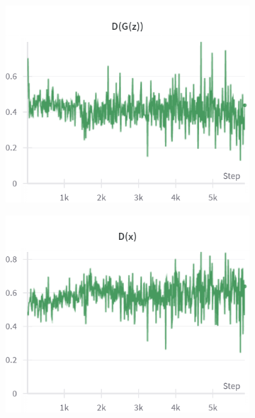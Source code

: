 \begin{figure}[H]
    \begin{subfigure}{0.45\textwidth}
        \centering
        \includegraphics[width=0.95\linewidth]{cifar10/32/D_G_z.png}
        \caption{}
        \label{subfig:cifar10/32/D_G_z}
    \end{subfigure}%
    \begin{subfigure}{0.45\textwidth}
        \centering
        \includegraphics[width=0.95\linewidth]{cifar10/32/D_x.png}
        \caption{}
        \label{subfig:cifar10/32/D_x}
    \end{subfigure}


\end{figure}
